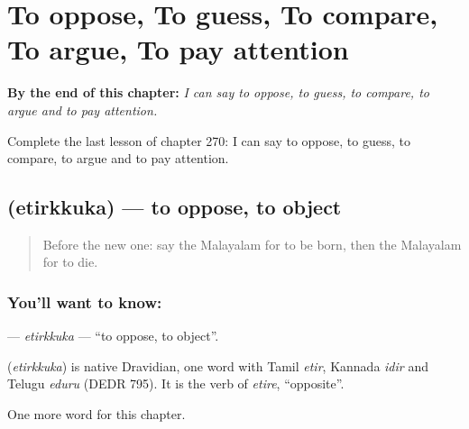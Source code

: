 
\chapter{To oppose, To guess, To compare, To argue, To pay attention}
\label{ch:ml-to-oppose-to-guess-to-compare-to-argue-to-pay-attention}

\begin{chapteropening}
\textbf{By the end of this chapter:} \emph{I can say to oppose, to guess, to compare, to argue and to pay attention.}

Complete the last lesson of chapter 270: I can say to oppose, to guess, to compare, to argue and to pay attention.
\end{chapteropening}

\section[\texorpdfstring{\ml{എതിർക്കുക} (etirkkuka)}{എതിർക്കുക (etirkkuka)}]{ (etirkkuka) — to oppose, to object}

\label{lesson:ML-C270-etirkkuka}



\begin{quote}
Before the new one: say the Malayalam for to be born, then the Malayalam for to die.
\end{quote}

\subsection*{You'll want to know: }
\textbf{} — \emph{etirkkuka} — \textquotedblleft{}to oppose, to object\textquotedblright{}.

\begin{cousinweb}
\textbf{} (\emph{etirkkuka}) is native Dravidian, one word with Tamil \emph{etir}, Kannada \emph{idir} and Telugu \emph{eduru} (DEDR 795). It is the verb of \emph{etire}, \textquotedblleft{}opposite\textquotedblright{}.
\end{cousinweb}

\begin{grammarlens}[title={What you've built}]
One more word for this chapter.
\end{grammarlens}

